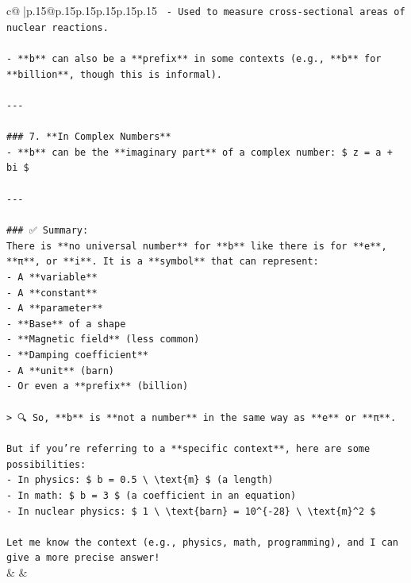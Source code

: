 \documentclass{article}
\begin{document}
{\begin{supertabular}{c@{$\;$}|p{.15\linewidth}@{}p{.15\linewidth}p{.15\linewidth}p{.15\linewidth}p{.15\linewidth}p{.15\linewidth}}
{{{\texttt{  {-} Used to measure cross{-}sectional areas of nuclear reactions.} \\
\\ 
\texttt{{-} **b** can also be a **prefix** in some contexts (e.g., **b** for **billion**, though this is informal).} \\
\\ 
\texttt{{-}{-}{-}} \\
\\ 
\texttt{\#\#\# 7. **In Complex Numbers**} \\
\texttt{{-} **b** can be the **imaginary part** of a complex number: \$ z = a + bi \$} \\
\\ 
\texttt{{-}{-}{-}} \\
\\ 
\texttt{\#\#\# ✅ Summary:} \\
\texttt{There is **no universal number** for **b** like there is for **e**, **π**, or **i**. It is a **symbol** that can represent:} \\
\texttt{{-} A **variable**} \\
\texttt{{-} A **constant**} \\
\texttt{{-} A **parameter**} \\
\texttt{{-} **Base** of a shape} \\
\texttt{{-} **Magnetic field** (less common)} \\
\texttt{{-} **Damping coefficient**} \\
\texttt{{-} A **unit** (barn)} \\
\texttt{{-} Or even a **prefix** (billion)} \\
\\ 
\texttt{> 🔍 So, **b** is **not a number** in the same way as **e** or **π**.} \\
\\ 
\texttt{But if you're referring to a **specific context**, here are some possibilities:} \\
\texttt{{-} In physics: \$ b = 0.5 \textbackslash{} \textbackslash{}text\{m\} \$ (a length)} \\
\texttt{{-} In math: \$ b = 3 \$ (a coefficient in an equation)} \\
\texttt{{-} In nuclear physics: \$ 1 \textbackslash{} \textbackslash{}text\{barn\} = 10\^{}\{{-}28\} \textbackslash{} \textbackslash{}text\{m\}\^{}2 \$} \\
\\ 
\texttt{Let me know the context (e.g., physics, math, programming), and I can give a more precise answer!} \\
            }
        }
    }
    & & \\ \\


\end{supertabular}}
\end{document}
